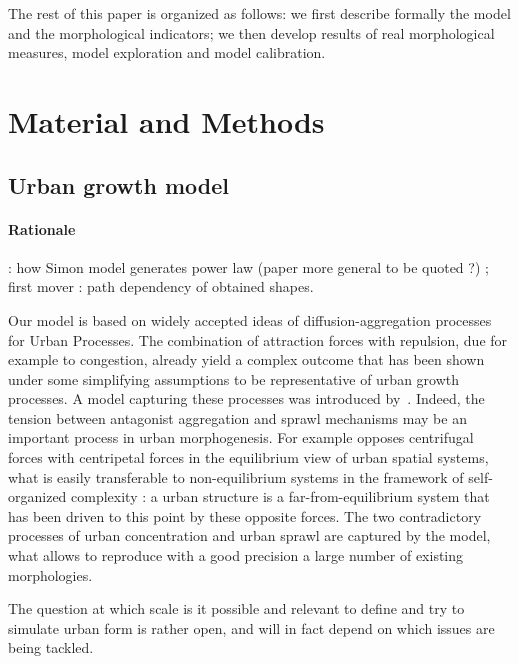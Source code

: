 \documentclass[10pt,letterpaper,draft]{article}
\begin{document}
The rest of this paper is organized as follows: we first describe formally the model and the morphological indicators; we then develop results of real morphological measures, model exploration and model calibration.


\section*{Material and Methods}


\subsection*{Urban growth model}



\paragraph*{Rationale}



\cite{2016arXiv160806313S} : how Simon model generates power law (paper more general to be quoted ?) ; first mover : path dependency of obtained shapes.



Our model is based on widely accepted ideas of diffusion-aggregation processes for Urban Processes. The combination of attraction forces with repulsion, due for example to congestion, already yield a complex outcome that has been shown under some simplifying assumptions to be representative of urban growth processes. A model capturing these processes was introduced by~\cite{batty2006hierarchy}. Indeed, the tension between antagonist aggregation and sprawl mechanisms may be an important process in urban morphogenesis. For example \cite{fujita1996economics} opposes centrifugal forces with centripetal forces in the equilibrium view of urban spatial systems, what is easily transferable to non-equilibrium systems in the framework of self-organized complexity : a urban structure is a far-from-equilibrium system that has been driven to this point by these opposite forces. The two contradictory processes of urban concentration and urban sprawl are captured by the model, what allows to reproduce with a good precision a large number of existing morphologies.


The question at which scale is it possible and relevant to define and try to simulate urban form is rather open, and will in fact depend on which issues are being tackled. 
\end{document}
